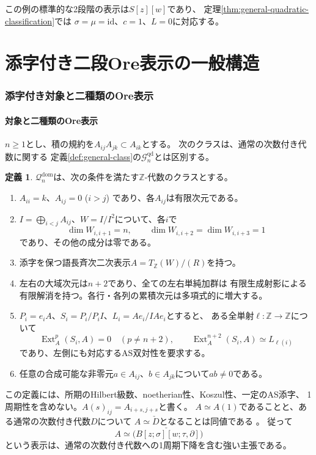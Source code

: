 \documentclass[11pt,a4paper]{ltjsarticle}
\theoremstyle{definition}
\newtheorem{definition}[theorem]{定義}
\newcommand{\Ext}{\operatorname{Ext}}
\newcommand{\Gclass}{\mathcal G}
\begin{document}
この例の標準的な2段階の表示は$S[z][w]$であり、
定理\ref{thm:general-quadratic-classification}では
$\sigma=\mu=\mathrm{id}$、$c=1$、$L=0$に対応する。


\clearpage
\part{添字付き二段Ore表示の一般構造}\label{part:indexed}
\section{添字付き対象と二種類のOre表示}
\label{genidx:sec:general-target}

\subsection{対象と二種類のOre表示}
$n\geq1$とし、積の規約を$A_{ij}A_{jk}\subset A_{ik}$とする。
次のクラスは、通常の次数付き代数に関する
定義\ref{def:general-class}の$\Gclass_n^{\mathrm{qd}}$とは区別する。

\begin{definition}\label{genidx:def:target}
$\mathcal Q_n^{\mathrm{dom}}$は、次の条件を満たす$\mathbb Z$-代数のクラスとする。
\begin{enumerate}
\item $A_{ii}=k$、$A_{ij}=0$ ($i>j$) であり、各$A_{ij}$は有限次元である。
\item $I=\bigoplus_{i<j}A_{ij}$、$W=I/I^2$について、各$i$で
\[
\dim W_{i,i+1}=n,\qquad
\dim W_{i,i+2}=\dim W_{i,i+3}=1
\]
であり、その他の成分は零である。
\item 添字を保つ語長斉次二次表示$A=T_{\mathbb Z}(W)/(R)$を持つ。
\item 左右の大域次元は$n+2$であり、全ての左右単純加群は
有限生成射影による有限解消を持つ。各行・各列の累積次元は多項式的に増大する。
\item $P_i=e_iA$、$S_i=P_i/P_iI$、$L_i=Ae_i/IAe_i$とすると、
ある全単射$\ell:\mathbb Z\to\mathbb Z$について
\[
\Ext_A^p(S_i,A)=0\quad(p\ne n+2),\qquad
\Ext_A^{n+2}(S_i,A)\simeq L_{\ell(i)}
\]
であり、左側にも対応するAS双対性を要求する。
\item 任意の合成可能な非零元$a\in A_{ij}$、$b\in A_{jk}$について$ab\ne0$である。
\end{enumerate}
\end{definition}

この定義には、所期のHilbert級数、noetherian性、Koszul性、一定のAS添字、
1周期性を含めない。$A(s)_{ij}=A_{i+s,j+s}$と書く。
$A\simeq A(1)$であることと、ある通常の次数付き代数$D$について
$A\simeq\check D$となることは同値である
\cite[Lemma 3.4]{VdB}。
従って
\begin{equation}\label{genidx:eq:graded-descent-question}
A\simeq\check{\bigl(B[z;\sigma][w;\tau,\partial]\bigr)}
\end{equation}
という表示は、通常の次数付き代数への1周期下降を含む強い主張である。
\end{document}
